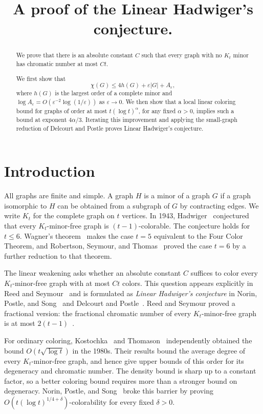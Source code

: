\documentclass[11pt]{article}
\title{A proof of the Linear Hadwiger's conjecture. }
\date{}
\begin{document}
\maketitle

\begin{abstract}
We prove that there is an absolute constant $C$ such that every graph
with no $K_t$ minor has chromatic number at most $Ct$. 

We first show that $$\chi(G)\le4h(G)+\varepsilon|G|+A_\varepsilon,$$
where $h(G)$ is the largest order of a complete minor and
$\log A_\varepsilon=O(\varepsilon^{-2}\log(1/\varepsilon))$ as
$\varepsilon\to0$. We then show that a local linear coloring bound
for graphs of order at most $t(\log t)^\alpha$, for any fixed
$\alpha>0$, implies such a bound at exponent $4\alpha/3$.
Iterating this improvement and applying the small-graph
reduction of Delcourt and Postle proves Linear Hadwiger's conjecture.
\end{abstract}

\section{Introduction}

All graphs are finite and simple. A graph $H$ is a minor of a graph
$G$ if a graph isomorphic to $H$ can be obtained from a subgraph of
$G$ by contracting edges. We write $K_t$ for the complete graph on
$t$ vertices. In 1943, Hadwiger~\cite{Had} conjectured that every
$K_t$-minor-free graph is $(t-1)$-colorable. The conjecture holds for
$t\le6$. Wagner's theorem~\cite{Wag} makes the case $t=5$ equivalent
to the Four Color Theorem, and Robertson, Seymour, and
Thomas~\cite{RST} proved the case $t=6$ by a further reduction to
that theorem.

The linear weakening asks whether an absolute constant $C$ suffices
to color every $K_t$-minor-free graph with at most $Ct$ colors.
This question appears explicitly in Reed and Seymour~\cite[p.~148]{RS}
and is formulated as \emph{Linear Hadwiger's conjecture} in
Norin, Postle, and Song~\cite[Conjecture~1.2]{NPS} and Delcourt and
Postle~\cite[Conjecture~1.2]{DP}. Reed and Seymour proved a fractional
version: the fractional chromatic number of every $K_t$-minor-free
graph is at most $2(t-1)$~\cite[Theorem~1.3]{RS}.

For ordinary coloring, Kostochka~\cite{Kos} and Thomason~\cite{Tho}
independently obtained the bound $O(t\sqrt{\log t})$ in the 1980s.
Their results bound the average degree of every $K_t$-minor-free
graph, and hence give upper bounds of this order for its degeneracy
and chromatic number. The density bound is sharp up to a constant
factor, so a better coloring bound requires more than a stronger
bound on degeneracy. Norin, Postle, and Song~\cite[Theorem~1.4]{NPS}
broke this barrier by proving $O(t(\log t)^{1/4+\delta})$-colorability
for every fixed $\delta>0$.
\end{document}
